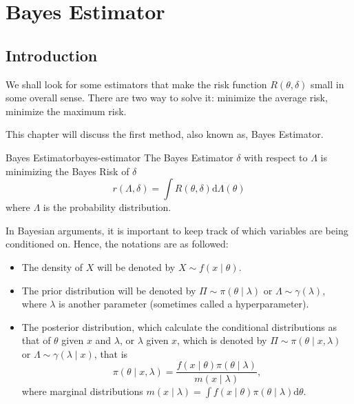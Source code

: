 \chapter{Bayes Estimator}

\section{Introduction}

We shall look for some estimators that make the risk function $R\left(\theta,\delta\right)$ small in some overall sense. There are two way to solve it: minimize the average risk, minimize the maximum risk.

This chapter will discuss the first method, also known as, Bayes Estimator.

\begin{definition}{Bayes Estimator}{bayes-estimator}
    The Bayes Estimator $\delta$ with respect to $\Lambda$ is minimizing the Bayes Risk of $\delta$
    \begin{equation}
        r\left(\Lambda, \delta\right)=\int R\left(\theta, \delta\right) \mathrm{d} \Lambda\left(\theta\right)
    \end{equation}
    where $\Lambda$ is the probability distribution.
\end{definition}

In Bayesian arguments, it is important to keep track of which variables are being conditioned on. Hence, the notations are as followed:
\begin{itemize}
    \item The density of $X$ will be denoted by $X \sim f\left(x \mid \theta\right)$.
    \item The prior distribution will be denoted by $\Pi \sim \pi\left(\theta \mid \lambda\right)$ or $\Lambda \sim \gamma\left(\lambda\right)$, where $\lambda$ is another parameter (sometimes called a hyperparameter).
    \item The posterior distribution, which calculate the conditional distributions as that of $\theta$ given $x$ and $\lambda$, or $\lambda$ given $x$, which is denoted by $\Pi \sim \pi\left(\theta \mid x, \lambda\right)$ or $\Lambda \sim \gamma\left(\lambda \mid x\right)$, that is
    \begin{equation}
        \pi\left(\theta \mid x, \lambda\right) = \frac{f\left(x \mid \theta\right) \pi\left(\theta \mid \lambda\right)}{m\left(x \mid \lambda\right)},
    \end{equation}
    where marginal distributions $m\left(x \mid \lambda\right) = \int f\left(x \mid \theta\right) \pi\left(\theta \mid \lambda\right) \mathrm{d} \theta$.
\end{itemize}

